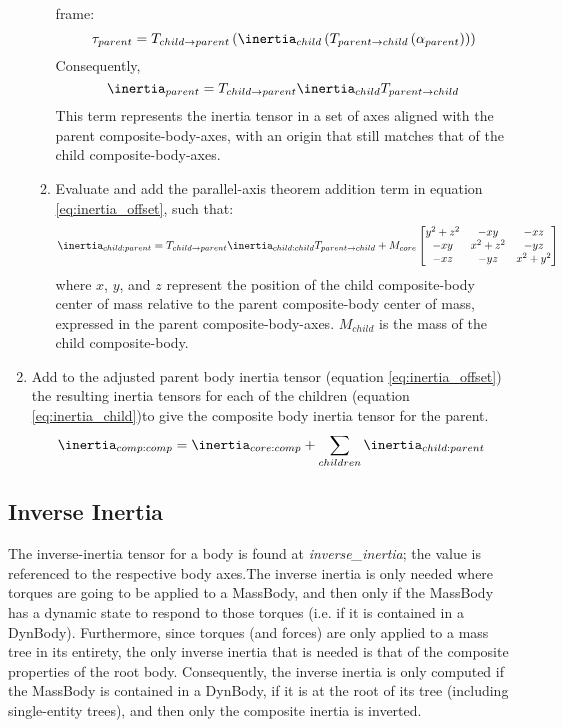 \begin{enumerate}
\begin{enumerate}
  frame:
  \begin{equation*}
   \tau_{parent} = T_{child \rightarrow parent} \left( \inertia_{child}
   \left( T_{parent \rightarrow child} \left( \alpha_{parent} \right) \right)
   \right)
  \end{equation*}
 Consequently,\begin{equation}
   \inertia_{parent} = T_{child \rightarrow parent}  \inertia_{child}
   T_{parent \rightarrow child}
  \end{equation}
  This term represents the inertia tensor in a set of axes aligned with the
  parent composite-body-axes, with an origin that still matches that of the
  child composite-body-axes.
  \item Evaluate and add the parallel-axis theorem addition term in equation
  \ref{eq:inertia_offset}, such that:
  \begin{equation}\label{eq:inertia_child}
   \inertia_{child:parent} = T_{child \rightarrow parent}
   \inertia_{child:child}   T_{parent \rightarrow child} + M_{core}
   \begin{bmatrix} y^2 + z^2 & -xy & -xz \\-xy & x^2 + z^2 & -yz \\ -xz & -yz
   & x^2+y^2 \end{bmatrix}
  \end{equation}
  where $x$, $y$, and $z$ represent the position of the child composite-body
  center of mass relative to the parent composite-body center of mass,
  expressed in the parent composite-body-axes.  $M_{child}$ is the mass of the
  child composite-body.

 \end{enumerate}
 \item Add to the adjusted parent body inertia tensor (equation
 \ref{eq:inertia_offset}) the resulting inertia tensors for each of the
 children (equation \ref{eq:inertia_child})to give the composite body inertia
 tensor for the parent.\begin{equation}
  \inertia_{comp:comp} = \inertia_{core:comp} + \sum_{children}
  \inertia_{child:parent}
 \end{equation}

 \end{enumerate}




\subsection{Inverse Inertia}
The inverse-inertia tensor for a body is found at
\textit{inverse\_inertia}; the value is referenced to the respective body
axes.The inverse inertia is only needed where torques are going to be applied
to a
MassBody, and then only if the MassBody has a dynamic state to respond to
those torques (i.e. if it is contained in a DynBody).  Furthermore, since torques (and
forces) are only applied to a mass tree in its entirety, the only inverse
inertia that is needed is that of the composite properties of the root body.
Consequently, the inverse inertia is only computed if the MassBody is contained in a
DynBody, if it is at the root of its tree (including single-entity trees), and
then only the composite inertia is inverted.


